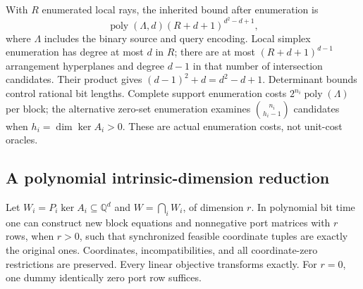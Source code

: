 With $R$ enumerated local rays, the inherited bound after enumeration is
\[
 \operatorname{poly}(\Lambda,d)(R+d+1)^{d^2-d+1},
\]
where $\Lambda$ includes the binary source and query encoding.  Local
simplex enumeration has degree at most $d$ in $R$; there are at most
$(R+d+1)^{d-1}$ arrangement hyperplanes and degree $d-1$ in that
number of intersection candidates.  Their product gives
$(d-1)^2+d=d^2-d+1$.  Determinant bounds control rational bit lengths.
Complete support enumeration costs $2^{n_i}\operatorname{poly}(\Lambda)$ per block;
the alternative zero-set enumeration examines
$\binom{n_i}{h_i-1}$ candidates when $h_i=\dim\ker A_i>0$.
These are actual enumeration costs, not unit-cost oracles.

\subsection{A polynomial intrinsic-dimension reduction}

\begin{proposition}
\label{thm:intrinsic-common-port}
Let $W_i=P_i\ker A_i\subseteq\mathbb Q^d$ and
$W=\bigcap_i W_i$, of dimension $r$.  In polynomial bit time one can
construct new block equations and nonnegative port matrices with $r$
rows, when $r>0$, such that synchronized feasible coordinate tuples are
exactly the original ones.  Coordinates, incompatibilities, and all
coordinate-zero restrictions are preserved.  Every linear objective
transforms exactly.  For $r=0$, one dummy identically zero port row
suffices.
\end{proposition}

